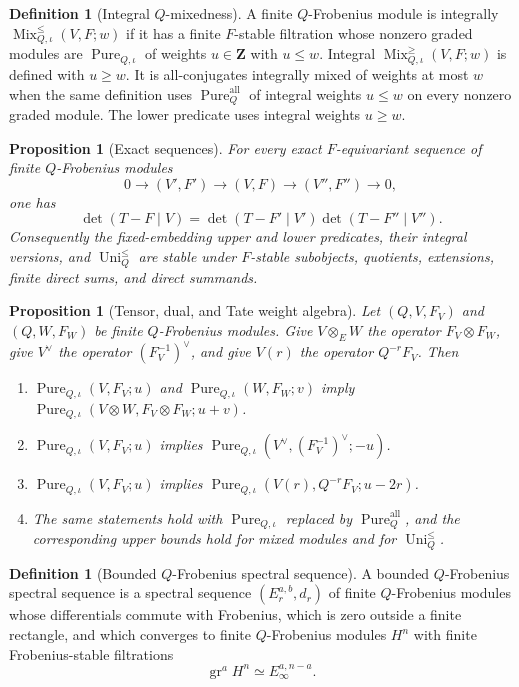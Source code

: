 \documentclass[10pt]{article}
\newtheorem{proposition}[theorem]{Proposition}
\theoremstyle{definition}
\newtheorem{definition}[theorem]{Definition}
\newcommand{\MixLe}{\operatorname{Mix}^{\leq}}
\newcommand{\MixGe}{\operatorname{Mix}^{\geq}}
\newcommand{\UniLe}{\operatorname{Uni}^{\leq}}
\newcommand{\Pure}{\operatorname{Pure}}
\newcommand{\gr}{\operatorname{gr}}
\begin{document}
\begin{definition}[Integral \(Q\)-mixedness]
A finite \(Q\)-Frobenius module is integrally
\(\MixLe_{Q,\iota}(V,F;w)\) if it has a finite \(F\)-stable filtration whose
nonzero graded modules are \(\Pure_{Q,\iota}\) of weights
\(u\in\mathbf Z\) with \(u\le w\).  Integral
\(\MixGe_{Q,\iota}(V,F;w)\) is defined with \(u\ge w\).  It is
all-conjugates integrally mixed of weights at most \(w\) when the same
definition uses \(\Pure_Q^{\mathrm{all}}\) of integral weights \(u\leq w\)
on every nonzero graded module.  The lower predicate uses integral weights
\(u\geq w\).
\end{definition}

\begin{proposition}[Exact sequences]
For every exact \(F\)-equivariant sequence of finite \(Q\)-Frobenius modules
\[
 0\longrightarrow(V',F')\longrightarrow(V,F)
   \longrightarrow(V'',F'')\longrightarrow0,
\]
one has
\[
 \det(T-F\mid V)=\det(T-F'\mid V')\det(T-F''\mid V'').
\]
Consequently the fixed-embedding upper and lower predicates, their integral
versions, and \(\UniLe_Q\) are stable under \(F\)-stable subobjects,
quotients, extensions, finite direct sums, and direct summands.
\end{proposition}

\begin{proposition}[Tensor, dual, and Tate weight algebra]
Let \((Q,V,F_V)\) and \((Q,W,F_W)\) be finite \(Q\)-Frobenius modules.
Give \(V\otimes_EW\) the operator \(F_V\otimes F_W\), give \(V^\vee\)
the operator \((F_V^{-1})^\vee\), and give \(V(r)\) the operator
\(Q^{-r}F_V\).  Then
\begin{enumerate}[label=\textup{\(\roman*\)}]
\item \(\Pure_{Q,\iota}(V,F_V;u)\) and
\(\Pure_{Q,\iota}(W,F_W;v)\) imply
\(\Pure_{Q,\iota}(V\otimes W,F_V\otimes F_W;u+v)\).
\item \(\Pure_{Q,\iota}(V,F_V;u)\) implies
\(\Pure_{Q,\iota}(V^\vee,(F_V^{-1})^\vee;-u)\).
\item \(\Pure_{Q,\iota}(V,F_V;u)\) implies
\(\Pure_{Q,\iota}(V(r),Q^{-r}F_V;u-2r)\).
\item The same statements hold with \(\Pure_{Q,\iota}\) replaced by
\(\Pure_Q^{\mathrm{all}}\), and the corresponding upper bounds hold for
mixed modules and for \(\UniLe_Q\).
\end{enumerate}
\end{proposition}

\begin{definition}[Bounded \(Q\)-Frobenius spectral sequence]
A bounded \(Q\)-Frobenius spectral sequence is a spectral sequence
\((E_r^{a,b},d_r)\) of finite \(Q\)-Frobenius modules whose differentials
commute with Frobenius, which is zero outside a finite rectangle, and which
converges to finite \(Q\)-Frobenius modules \(H^n\) with finite
Frobenius-stable filtrations
\[
                         \gr^aH^n\simeq E_\infty^{a,n-a}.
\]
\end{definition}
\end{document}
